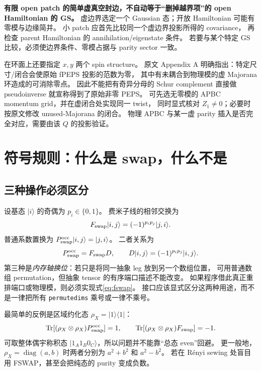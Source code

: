 \documentclass[11pt]{article}
\newcommand{\Tr}{\operatorname{Tr}}
\newcommand{\code}[1]{\texttt{\small #1}}
\begin{document}
\textbf{有限 open patch 的简单虚真空封边，不自动等于“删掉越界项”的 open Hamiltonian 的 GS。}
虚边界选定一个 Gaussian 态；开放 Hamiltonian 可能有零模与边缘简并。
小 patch 应首先比较同一个虚边界投影所得的 covariance，
再检查 parent Hamiltonian 的 annihilation/eigenstate 条件。
若要与某个特定 GS 比较，必须使边界条件、零模占据与 parity sector 一致。

在环面上还要指定 $x,y$ 两个 spin structure。
原文 Appendix A 明确指出：特定尺寸/闭合会使原始 fPEPS 投影的范数为零，
其中有未耦合到物理模的虚 Majorana 环造成的可消除零点。
因此不能把有奇异分母的 Schur complement 直接做 pseudoinverse 就宣称得到了原始非零 PEPS。
可先选无零模的 APBC momentum grid，并在虚闭合处实现同一 twist，
同时显式核对 $Z_1\ne0$；必要时按原文修改 unused-Majorana 的闭合。
物理 APBC 与某一虚 parity 插入是否完全对应，需要由该 $Q$ 的投影验证。

\section{符号规则：什么是 swap，什么不是}
\subsection{三种操作必须区分}

设基态 $|i\rangle$ 的奇偶为 $p_i\in\{0,1\}$。
费米子线的相邻交换为
\begin{equation}
 F_{\rm swap}|i,j\rangle=(-1)^{p_ip_j}|j,i\rangle.
 \label{eq:fswap}
\end{equation}
普通系数置换为 $P_{\rm swap}^{\rm occ}|i,j\rangle=|j,i\rangle$。
二者关系为
\begin{equation}
 P_{\rm swap}^{\rm occ}=F_{\rm swap}D,\qquad
 D|i,j\rangle=(-1)^{p_ip_j}|i,j\rangle.
 \label{eq:correction}
\end{equation}
第三种是\emph{内存轴换位}：若只是将同一抽象 leg 放到另一个数组位置，
可用普通数组 permutation，但抽象 tensor 的有序端口描述不能改变。
如果程序借此真正重排端口或物理模，则必须实现式\eqref{eq:fswap}。
接口应该显式区分这两种用途，而不是一律把所有 \code{permutedims} 乘号或一律不乘号。

最简单的反例是区域约化态 $\rho_X=|1\rangle\langle1|$：
\begin{equation}
 \Tr[(\rho_X\otimes\rho_X)P^{\rm occ}_{\rm swap}]=1,
 \qquad \Tr[(\rho_X\otimes\rho_X)F_{\rm swap}]=-1.
\end{equation}
可取整体偶宇称积态 $|1_A1_B0_C\rangle$，所以问题并不能靠“总态 even”回避。
更一般地，$\rho_X=\operatorname{diag}(a,b)$ 时两者分别为 $a^2+b^2$ 和 $a^2-b^2$。
若在 Rényi sewing 处盲目用 FSWAP，甚至会把纯态的 purity 变成负数。
\end{document}
